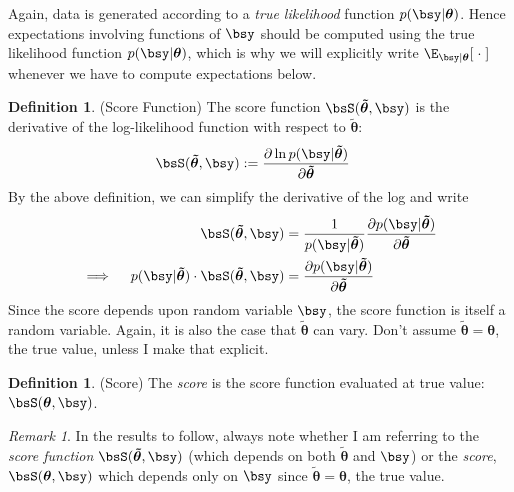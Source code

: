 \documentclass[12pt]{article}
\theoremstyle{plain}
\theoremstyle{definition}
\newtheorem{defn}[thm]{Definition}
\theoremstyle{remark}
\newtheorem*{rmk}{Remark}
\newcommand{\bstheta}{\boldsymbol{\theta}}
\newcommand{\bstildetheta}{\boldsymbol{\tilde{\theta}}}
\begin{document}
Again, data is generated according to a \emph{true likelihood} function
$p(\bsy|\bstheta)$. Hence expectations involving functions of $\bsy$
should be computed using the true likelihood function
$p(\bsy|\bstheta)$, which is why we will explicitly write
$\E_{\bsy|\bstheta}[\;\cdot\;]$ whenever we have to compute expectations
below.


\begin{defn}(Score Function)
The score function $\bsS(\bstildetheta,\bsy)$ is the derivative of the
log-likelihood function with respect to $\bstildetheta$:
\begin{align}
  \bsS(\bstildetheta,\bsy) &:=
  \frac{\partial \ln p(\bsy|\bstildetheta)}{\partial \bstildetheta}
  \label{score1}
\end{align}
By the above definition, we can simplify the derivative of the log and
write
\begin{align}
  \bsS(\bstildetheta,\bsy)
  &=
  \frac{1}{p(\bsy|\bstildetheta)}
  \frac{\partial p(\bsy|\bstildetheta)}{\partial \bstildetheta}
  \label{score2} \\
  \implies\quad
  p(\bsy|\bstildetheta) \cdot \bsS(\bstildetheta,\bsy)
  &=
  \frac{\partial p(\bsy|\bstildetheta)}{\partial \bstildetheta}
  \label{score3}
\end{align}
Since the score depends upon random variable $\bsy$, the score function
is itself a random variable. Again, it is also the case that
$\bstildetheta$ can vary. Don't assume $\bstildetheta=\bstheta$, the
true value, unless I make that explicit.
\end{defn}

\begin{defn}(Score)
The \emph{score} is the score function evaluated at true value:
$\bsS(\bstheta,\bsy)$.
\end{defn}
\begin{rmk}
In the results to follow, always note whether I am referring to the
\emph{score function} $\bsS(\bstildetheta,\bsy)$ (which depends on both
$\bstildetheta$ and $\bsy$) or the \emph{score}, $\bsS(\bstheta,\bsy)$
which depends only on $\bsy$ since $\bstildetheta=\bstheta$, the true
value.
\end{rmk}
\end{document}
